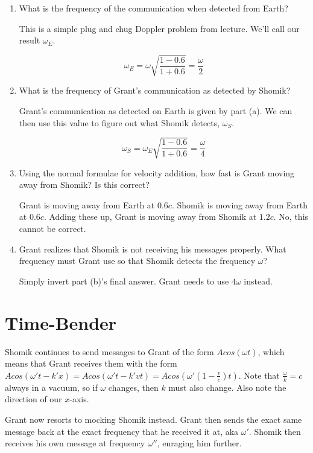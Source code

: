 \documentclass{article}
\begin{document}
\begin{enumerate}[label=(\alph*)]
    \item What is the frequency of the communication when detected from Earth?

    This is a simple plug and chug Doppler problem from lecture. We'll call our result $\omega_E$.

    $$\omega_E = \omega \sqrt{\frac{1 - 0.6}{1 + 0.6}} = \boxed{\frac{\omega}{2}}$$
    
    \item What is the frequency of Grant's communication as detected by Shomik?

    Grant's communication as detected on Earth is given by part (a). We can then use this value to figure out what Shomik detects, $\omega_S$.

    $$\omega_S = \omega_E \sqrt{\frac{1 - 0.6}{1 + 0.6}} = \boxed{\frac{\omega}{4}}$$
    
    \item Using the normal formulae for velocity addition, how fast is Grant moving away from Shomik? Is this correct?

    Grant is moving away from Earth at $0.6c$. Shomik is moving away from Earth at $0.6c$. Adding these up, Grant is moving away from Shomik at $\boxed{1.2c}$. No, this cannot be correct.
    
    \item Grant realizes that Shomik is not receiving his messages properly. What frequency must Grant use so that Shomik detects the frequency $\omega$?

    Simply invert part (b)'s final answer. Grant needs to use $\boxed{4\omega}$ instead.
\end{enumerate}

\newpage

\section{Time-Bender}

Shomik continues to send messages to Grant of the form $Acos(\omega t)$, which means that Grant receives them with the form $Acos(\omega' t - k'x) = Acos(\omega' t - k'vt) = Acos(\omega' \left(1 - \frac{v}{c} \right) t)$. Note that $\frac{\omega}{k} = c$ always in a vacuum, so if $\omega$ changes, then $k$ must also change. Also note the direction of our $x$-axis.

Grant now resorts to mocking Shomik instead. Grant then sends the exact same message back at the exact frequency that he received it at, aka $\omega'$. Shomik then receives his own message at frequency $\omega''$, enraging him further.
\end{document}
